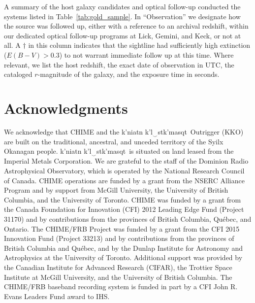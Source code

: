 \documentclass[twocolumn,linenumbers]{aastex631}
\newcommand{\kkoname}{k'ni\textipa{P}atn k'l$\left._\mathrm{\smile}\right.$stk'masqt}
\newcommand{\dmh}{\ensuremath{{\rm DM}_\textrm{h}}}
\begin{document}
\begin{CJK*}{UTF8}{gbsn}
\begin{table}
\caption{A summary of the host galaxy candidates and optical follow-up conducted the systems listed in Table~\ref{tab:gold_sample}. In ``Observation'' we designate how the source was followed up, either with a reference to an archival redshift, within our dedicated optical follow-up programs at Lick, Gemini, and Keck, or not at all. A $\dagger$ in this column indicates that the sightline had sufficiently high extinction ($E(B-V) > 0.3$) to not warrant immediate follow up at this time. Where relevant, we list the host redshift, the exact date of observation in UTC, the cataloged $r$-magnitude of the galaxy, and the exposure time in seconds.}

\label{tab:z_table}
\end{table}

% 
\section{Acknowledgments}
We acknowledge that CHIME and the \kkoname\ Outrigger (KKO) are built on the traditional, ancestral, and unceded territory of the Syilx Okanagan people. \kkoname\ is situated on land leased from the Imperial Metals Corporation. We are grateful to the staff of the Dominion Radio Astrophysical Observatory, which is operated by the National Research Council of Canada. CHIME operations are funded by a grant from the NSERC Alliance Program and by support from McGill University, the University of British Columbia, and the University of Toronto. CHIME was funded by a grant from the Canada Foundation for Innovation (CFI) 2012 Leading Edge Fund (Project 31170) and by contributions from the provinces of British Columbia, Qu\'ebec, and Ontario. The CHIME/FRB Project was funded by a grant from the CFI 2015 Innovation Fund (Project 33213) and by contributions from the provinces of British Columbia and Qu\'ebec, and by the Dunlap Institute for Astronomy and Astrophysics at the University of Toronto. Additional support was provided by the Canadian Institute for Advanced Research (CIFAR), the Trottier Space Institute at McGill University, and the University of British Columbia. The CHIME/FRB baseband recording system is funded in part by a CFI John R. Evans Leaders Fund award to IHS.


\end{CJK*}
\end{document}
